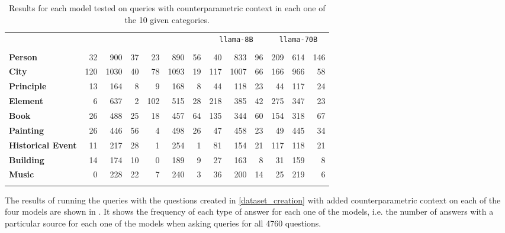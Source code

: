 \begin{table*}[t]
	\caption{Results for each model tested on queries with counterparametric context in each one of the 10 given categories.}
	\label{cats_table}
	\centering
	\footnotesize
	\begin{tabular}{>{\bfseries}l | r r r | r r r | r r r | r r r}
		\toprule
			& \multicolumn{3}{c|}{\smallflan{}} & \multicolumn{3}{c|}{\bigflan{}} & \multicolumn{3}{c|}{\texttt{llama-8B}} & \multicolumn{3}{c}{\texttt{llama-70B}}  \\
			& \Pc{} & \Cc{} & \Oc{} & \Pc{} & \Cc{} & \Oc{} & \Pc{} & \Cc{} & \Oc{} & \Pc{} & \Cc{} & \Oc{}  \\
		\midrule
			Person           &  32 &  900 & 37 &  23 &  890 & 56 &  40 &  833 & 96 & 209 & 614 & 146 \\
			City             & 120 & 1030 & 40 &  78 & 1093 & 19 & 117 & 1007 & 66 & 166 & 966 &  58 \\
			Principle        &  13 &  164 &  8 &   9 &  168 &  8 &  44 &  118 & 23 &  44 & 117 &  24 \\
			Element          &   6 &  637 &  2 & 102 &  515 & 28 & 218 &  385 & 42 & 275 & 347 &  23 \\
			Book             &  26 &  488 & 25 &  18 &  457 & 64 & 135 &  344 & 60 & 154 & 318 &  67 \\
			Painting         &  26 &  446 & 56 &   4 &  498 & 26 &  47 &  458 & 23 &  49 & 445 &  34 \\
			Historical Event &  11 &  217 & 28 &   1 &  254 &  1 &  81 &  154 & 21 & 117 & 118 &  21 \\
			Building         &  14 &  174 & 10 &   0 &  189 &  9 &  27 &  163 &  8 &  31 & 159 &   8 \\
			Music      &   0 &  228 & 22 &   7 &  240 &  3 &  36 &  200 & 14 &  25 & 219 &   6 \\
		\bottomrule \addlinespace[4pt]
	\end{tabular}
\end{table*}

The results of running the queries with the questions created in \cref{dataset_creation} with added counterparametric context on each of the four models are shown in 
. 
It shows the frequency of each type of answer for each one of the models,
i.e. the number of answers with a particular source for each one of the models when asking queries for all 4760 questions.


